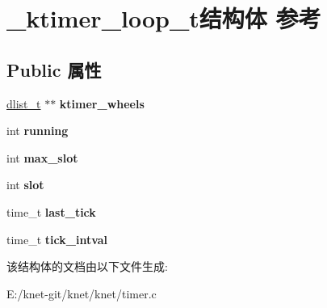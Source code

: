 \hypertarget{struct__ktimer__loop__t}{}\section{\+\_\+ktimer\+\_\+loop\+\_\+t结构体 参考}
\label{struct__ktimer__loop__t}
\subsection*{Public 属性}
\begin{DoxyCompactItemize}
\item 
\hypertarget{struct__ktimer__loop__t_af68f6f946f2b3583d04d8a459b738d29}{}\hyperlink{struct__dlist__t}{dlist\+\_\+t} $\ast$$\ast$ {\bfseries ktimer\+\_\+wheels}\label{struct__ktimer__loop__t_af68f6f946f2b3583d04d8a459b738d29}

\item 
\hypertarget{struct__ktimer__loop__t_aab0b79491b93f3752c93dfb1d8c60e66}{}int {\bfseries running}\label{struct__ktimer__loop__t_aab0b79491b93f3752c93dfb1d8c60e66}

\item 
\hypertarget{struct__ktimer__loop__t_aeb8772fdff5de87ce1db9878f1357043}{}int {\bfseries max\+\_\+slot}\label{struct__ktimer__loop__t_aeb8772fdff5de87ce1db9878f1357043}

\item 
\hypertarget{struct__ktimer__loop__t_ae54f1df7a355b968dcc9baf7dca10a8d}{}int {\bfseries slot}\label{struct__ktimer__loop__t_ae54f1df7a355b968dcc9baf7dca10a8d}

\item 
\hypertarget{struct__ktimer__loop__t_aa0cf5e5f3b5532aa4335d25831c9d2c3}{}time\+\_\+t {\bfseries last\+\_\+tick}\label{struct__ktimer__loop__t_aa0cf5e5f3b5532aa4335d25831c9d2c3}

\item 
\hypertarget{struct__ktimer__loop__t_a5bfbb75720e6a5310417980347763c82}{}time\+\_\+t {\bfseries tick\+\_\+intval}\label{struct__ktimer__loop__t_a5bfbb75720e6a5310417980347763c82}

\end{DoxyCompactItemize}


该结构体的文档由以下文件生成\+:\begin{DoxyCompactItemize}
\item 
E\+:/knet-\/git/knet/knet/timer.\+c\end{DoxyCompactItemize}
